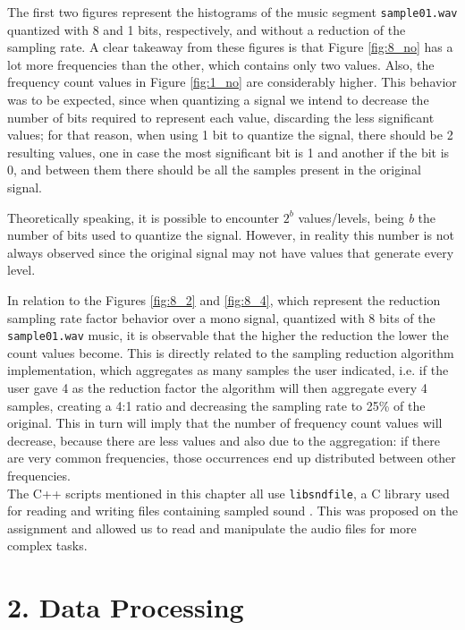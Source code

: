 \documentclass[12pt]{article}
\begin{document}
The first two figures represent the histograms of the music segment 
\texttt{sample01.wav} quantized with 8 and 1 bits, respectively, and without a 
reduction of the sampling rate. 
A clear takeaway from these figures is that Figure \ref{fig:8_no} has a lot 
more frequencies than the other, which contains only two values.
Also, the frequency count values in Figure \ref{fig:1_no} are considerably higher. 
This behavior was to be expected, since when quantizing a signal we intend to 
decrease the number of bits required to represent each value, discarding the less 
significant values; for that reason, when using 1 bit to quantize the signal, 
there should be 2 resulting values, one in case the most significant bit is 1 and 
another if the bit is 0, and between them there should be all the samples 
present in the original signal. 

Theoretically speaking, it is possible to encounter $2^{b}$ values/levels, being 
{\it b\/} the number of bits used to quantize the signal.
However, in reality this number is not always observed since the original signal may not have values that generate every level. 

In relation to the Figures \ref{fig:8_2} and \ref{fig:8_4}, which represent the 
reduction sampling rate factor behavior over a mono signal, quantized with 8 bits 
of the \texttt{sample01.wav} music, it is observable that the higher the reduction
the lower the count values become. 
This is directly related to the sampling reduction algorithm implementation, 
which aggregates as many samples the user indicated, i.e. if the user gave 4 as 
the reduction factor the algorithm will then aggregate every 4 samples, creating 
a 4:1 ratio and decreasing the sampling rate to 25\% of the original. 
This in turn will imply that the number of frequency count values will decrease,
because there are less values and also due to the aggregation: if there are very 
common frequencies, those occurrences end up distributed between other frequencies. \\

The C++ scripts mentioned in this chapter all use \texttt{libsndfile}, a C 
library used for reading and writing files containing sampled sound \cite{libsndfile}.
This was proposed on the assignment and allowed us to read and manipulate the 
audio files for more complex tasks.

\newpage
\section*{2. Data Processing}
\end{document}
